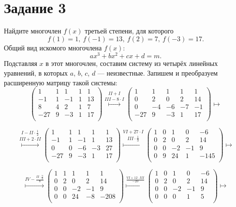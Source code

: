 \documentclass[a4paper,12pt]{article}
\begin{document}
\section*{Задание 3}
Найдите многочлен $f(x)$ третьей степени, для которого 
\[
f(1) = 1, \ f(-1) = 13, \ f(2) = 7, \ f(-3) = 17.
\]
Общий вид искомого многочлена $f(x)$:
$$ax^3 + bx^2 + cx + d = m.$$
Подставляя $x$ в этот многочлен, составим систему из четырёх линейных уравнений, в которых $a$, $b$, $c$, $d$ --- неизвестные. Запишем и преобразуем расширенную матрицу такой системы: 
$$
\left(\begin{array}{cccc|c}
1 & 1 & 1 & 1 & 1 \\
-1 & 1 & -1 & 1 & 13 \\
8 & 4 & 2 & 1 & 7 \\
-27 & 9 & -3 & 1 & 17 \\
\end{array} \right) 
\overset{II+I}{\overset{III-8\cdot I}{\longmapsto}}
\left(\begin{array}{cccc|c}
1 & 1 & 1 & 1 & 1 \\
0 & 2 & 0 & 2 & 14 \\
0 & -4 & -6 & -7 & -1 \\
-27 & 9 & -3 & 1 & 17 \\
\end{array} \right) 
\longmapsto $$

$$ \overset{I-II\cdot \frac{1}{2}}{\overset{III+2\cdot II}{\longmapsto}}
\left(\begin{array}{cccc|c}
1 & 1 & 1 & 1 & 1 \\
-1 & 1 & -1 & 1 & 13 \\
0 & 0 & -6 & -3 & 27 \\
-27 & 9 & -3 & 1 & 17 \\
\end{array} \right)
\overset{VI+27 \cdot I}{\overset{III \cdot \frac{1}{3}}{\longmapsto}}
\left(\begin{array}{cccc|c}
1 & 0 & 1 & 0 & -6 \\
0 & 2 & 0 & 2 & 14 \\
0 & 0 & -2 & -1 & 9 \\
0 & 9 & 24 & 1 & -145 \\
\end{array} \right) 
\longmapsto 
$$


$$ \overset{IV-\frac{II \cdot \frac{9}{2}}{8}}{\longmapsto}
\left(\begin{array}{cccc|c}
1 & 1 & 1 & 1 & 1 \\
0 & 2 & 0 & 2 & 14 \\
0 & 0 & -2 & -1 & 9 \\
0 & 0 & 24 & -8 & -208 \\
\end{array} \right)
\overset{\frac{VI+12 \cdot III}{-20}}{\longmapsto}
\left(\begin{array}{cccc|c}
1 & 0 & 1 & 0 & -6 \\
0 & 2 & 0 & 2 & 14 \\
0 & 0 & -2 & -1 & 9 \\
0 & 0 & 0 & 1 & 5 \\
\end{array} \right) 
\longmapsto 
$$
\end{document}
